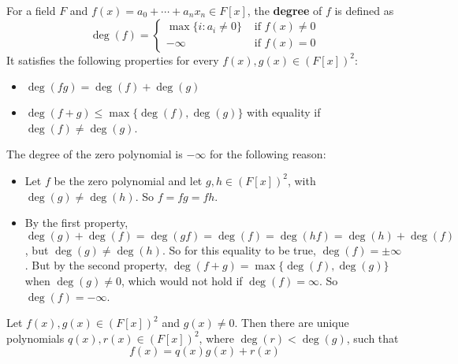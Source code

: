 \begin{definition}\label{def:deg}
	For a field $F$ and $f(x) = a_0 + \cdots + a_n x_n \in F[x]$, the \textbf{degree} of $f$ is defined as
	\[
		\deg(f) = \begin{cases}
			\max \{ i: a_i \ne 0 \} & \text{ if } f(x) \ne 0 \\
			-\infty & \text{ if } f(x) = 0
		\end{cases}
	\]
	It satisfies the following properties for every $f(x), g(x) \in {(F[x])}^2$:
	\begin{itemize}
		\item $\deg(fg) = \deg(f) + \deg(g)$
		\item $\deg(f + g) \le \max \{ \deg(f), \deg(g) \}$ with equality if $\deg(f) \ne \deg(g)$.
	\end{itemize}
	The degree of the zero polynomial is $-\infty$ for the following reason:
	\begin{itemize}
		\item Let $f$ be the zero polynomial and let $g, h \in {(F[x])}^2$, with $\deg(g) \ne \deg(h)$. So $f = f g = f h$.
		\item By the first property, $\deg(g) + \deg(f) = \deg(g f) = \deg(f) = \deg(h f) = \deg(h) + \deg(f)$, but $\deg(g) \ne \deg(h)$. So for this equality to be true, $\deg(f) = \pm \infty$. But by the second property, $\deg(f + g) = \max \{ \deg(f), \deg(g) \}$ when $\deg(g) \ne 0$, which would not hold if $\deg(f) = \infty$. So $\deg(f) = -\infty$.
	\end{itemize}
\end{definition}

\begin{proposition}\label{prop:divisionAlgorithm}
	Let $f(x), g(x) \in {(F[x])}^2$ and $g(x) \ne 0$. Then there are unique polynomials $q(x), r(x) \in {(F[x])}^2$, where $\deg(r) < \deg(g)$, such that
	\[
		f(x) = q(x) g(x) + r(x)
	\]
\end{proposition}

